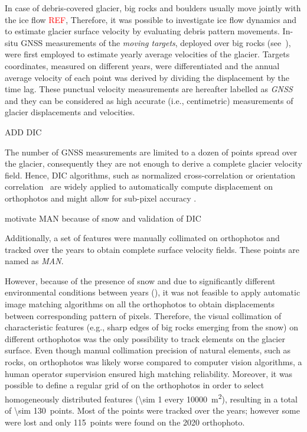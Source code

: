In case of debris-covered glacier, big rocks and boulders usually move jointly with the ice flow \textcolor{red}{REF}, 
Therefore, it was possible to investigate ice flow dynamics and to estimate glacier surface velocity by evaluating debris pattern movements.
In-situ GNSS measurements of the \textit{moving targets}, deployed over big rocks (see~),  were first employed to estimate yearly average velocities of the glacier.
Targets coordinates, measured on different years, were differentiated and the annual average velocity of each point was derived by dividing the displacement by the time lag. 
These punctual velocity measurements are hereafter labelled as \textit{GNSS} and they can be considered as high accurate (i.e., centimetric) measurements of glacier displacements and velocities.

{\color{red} ADD DIC}

The number of GNSS measurements are limited to a dozen of points spread over the glacier, consequently they are not enough to derive a complete glacier velocity field.
Hence, DIC algorithms, such as normalized cross-correlation or orientation correlation~\citep{Heid2012_evaluation_xcorr} are widely applied to automatically compute displacement on orthophotos and might allow for sub-pixel accuracy \citep{Debella_Gilo2011}.	

{\color{red} motivate MAN because of snow and validation of DIC}

Additionally, a set of features were manually collimated on orthophotos and tracked over the years to obtain complete surface velocity fields.
These points are named as \textit{MAN}.

However, because of the presence of snow and due to significantly different environmental conditions between years (), it was not feasible to apply automatic image matching algorithms on all the orthophotos to obtain displacements between corresponding pattern of pixels. 
Therefore, the visual collimation of characteristic features (e.g., sharp edges of big rocks emerging from the snow) on different orthophotos was the only possibility to track elements on the glacier surface. 
Even though manual collimation precision of natural elements, such as rocks, on orthophotos was likely worse compared to computer vision algorithms, a human operator supervision ensured high matching reliability.
Moreover, it was possible to define a regular grid of  on the orthophotos in order to select homogeneously distributed features (\qty{\sim 1}{\pt} every \qty{10000}{\meter\squared}), resulting in a total of \qty{\sim 130}{points}.
Most of the points were tracked over the years; however some were lost and only \qty{115}{points} were found on the 2020 orthophoto.


